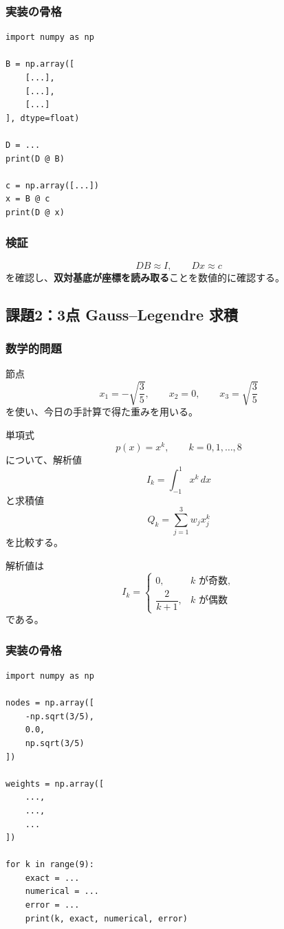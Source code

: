 \documentclass[a4paper,11pt]{ltjsarticle}
\begin{document}
\subsubsection*{実装の骨格}
\begin{verbatim}
import numpy as np

B = np.array([
    [...],
    [...],
    [...]
], dtype=float)

D = ...
print(D @ B)

c = np.array([...])
x = B @ c
print(D @ x)
\end{verbatim}

\subsubsection*{検証}
\[
DB\approx I,
\qquad
Dx\approx c
\]
を確認し、\textbf{双対基底が座標を読み取る}ことを数値的に確認する。

\subsection{課題2：3点 Gauss--Legendre 求積}

\subsubsection*{数学的問題}
節点
\[
x_1=-\sqrt{\frac35},\qquad
x_2=0,\qquad
x_3=\sqrt{\frac35}
\]
を使い、今日の手計算で得た重みを用いる。

単項式
\[
p(x)=x^k,\qquad k=0,1,\dots,8
\]
について、解析値
\[
I_k=\int_{-1}^{1}x^k\,dx
\]
と求積値
\[
Q_k=\sum_{j=1}^{3}w_jx_j^k
\]
を比較する。

解析値は
\[
I_k=
\begin{cases}
0,&k\text{ が奇数},\\[4pt]
\dfrac{2}{k+1},&k\text{ が偶数}
\end{cases}
\]
である。

\subsubsection*{実装の骨格}
\begin{verbatim}
import numpy as np

nodes = np.array([
    -np.sqrt(3/5),
    0.0,
    np.sqrt(3/5)
])

weights = np.array([
    ...,
    ...,
    ...
])

for k in range(9):
    exact = ...
    numerical = ...
    error = ...
    print(k, exact, numerical, error)
\end{verbatim}
\end{document}
